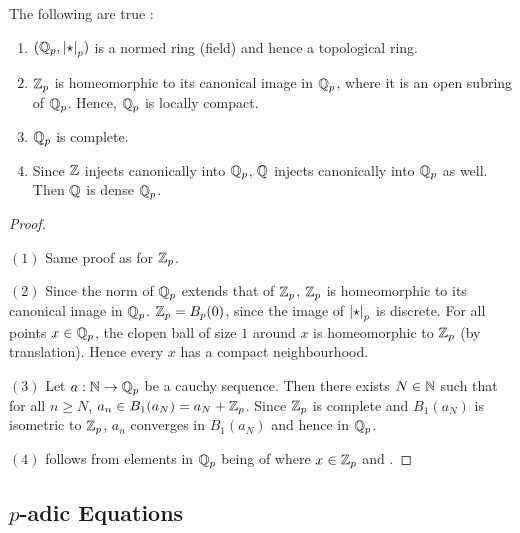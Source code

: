 \begin{prop}
  
  The following are true : 
  \begin{enumerate}
    \item $(\mathbb{Q}_p,\left\vert \star \right\vert_p)$ is a normed ring (field) 
    and hence a topological ring. 
    \item $\mathbb{Z}_p$ is homeomorphic to its canonical image in $\mathbb{Q}_p$,
    where it is an open subring of $\mathbb{Q}_p$.
    Hence, $\mathbb{Q}_p$ is locally compact. 
    \item $\mathbb{Q}_p$ is complete. 
    \item Since $\mathbb{Z}$ injects canonically into $\mathbb{Q}_p$, 
    $\mathbb{Q}$ injects canonically into $\mathbb{Q}_p$ as well. 
    Then $\mathbb{Q}$ is dense $\mathbb{Q}_p$.
  \end{enumerate}
\end{prop}
\begin{proof}~
  
  $(1)$ Same proof as for $\mathbb{Z}_p$.
  
  $(2)$ Since the norm of $\mathbb{Q}_p$ extends that of $\mathbb{Z}_p$, 
  $\mathbb{Z}_p$ is homeomorphic to its canonical image in $\mathbb{Q}_p$. 
  $\mathbb{Z}_p = B_{p}(0)$, since the image of $\left\vert \star \right\vert_p$ is discrete. 
  For all points $x \in \mathbb{Q}_p$, 
  the clopen ball of size $1$ around $x$ is homeomorphic to $\mathbb{Z}_p$ 
  (by translation).
  Hence every $x$ has a compact neighbourhood. 

  $(3)$ Let $a : \mathbb{N} \to \mathbb{Q}_p$ be a cauchy sequence. 
  Then there exists $N \in \mathbb{N}$ such that for all $n \geq N$, 
  $a_n \in B_1(a_N) = a_N + \mathbb{Z}_p$. 
  Since $\mathbb{Z}_p$ is complete and $B_1(a_N)$ is isometric to $\mathbb{Z}_p$,
  $a_n$ converges in $B_1(a_N)$
  and hence in $\mathbb{Q}_p$. 

  $(4)$ follows from elements in $\mathbb{Q}_p$ being 
  of 
  where $x \in \mathbb{Z}_p$ and 
  . 
\end{proof}

\subsection{$p$-adic Equations}

